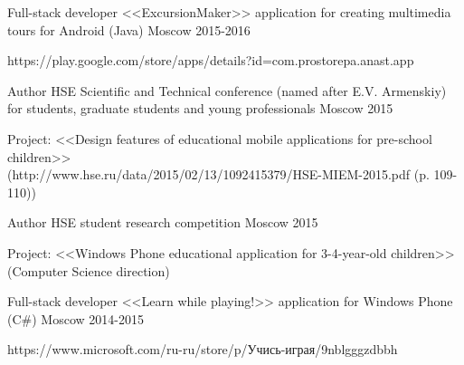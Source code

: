 \begin{cventries}

\cventry
{Full-stack developer} %
{<<ExcursionMaker>> application for creating multimedia tours for Android  (Java) } %
{Moscow} %
{2015-2016} %
{ %
	\begin{cvitems}
		\item {https://play.google.com/store/apps/details?id=com.prostorepa.anast.app}
	\end{cvitems}
}


\cventry
{Author} %
{HSE Scientific and Technical conference (named after E.V. Armenskiy) for students, graduate students and young professionals} %
{Moscow} %
{2015} %
{ %
\begin{cvitems}
\item {Project: <<Design features of educational mobile applications for pre-school children>>
	\\ (http://www.hse.ru/data/2015/02/13/1092415379/HSE-MIEM-2015.pdf (p. 109-110))}
\end{cvitems}
}

\cventry
{Author} %
{HSE student research competition} %
{Moscow} %
{2015} %
{ %
\begin{cvitems}
\item {Project: <<Windows Phone educational application for 3-4-year-old children>> (Computer Science direction)}
\end{cvitems}
}


\cventry
{Full-stack developer} %
{<<Learn while playing!>> application for Windows Phone  (C\#) } %
{Moscow} %
{2014-2015} %
{ %
	\begin{cvitems}
		\item {https://www.microsoft.com/ru-ru/store/p/Учись-играя/9nblgggzdbbh}
	\end{cvitems}
}

\end{cventries}